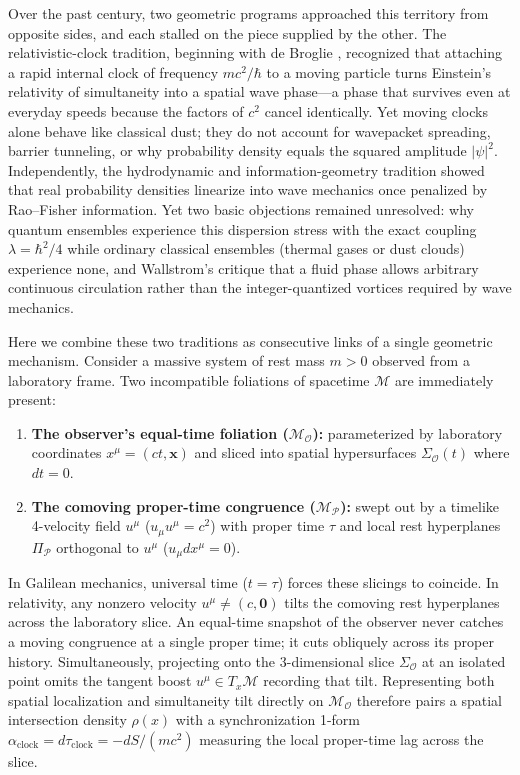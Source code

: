 \documentclass[11pt, a4paper]{article}
\theoremstyle{definition}
\begin{document}
Over the past century, two geometric programs approached this territory from opposite sides, and each stalled on the piece supplied by the other. The relativistic-clock tradition, beginning with de Broglie \cite{deBroglie1924}, recognized that attaching a rapid internal clock of frequency $mc^2/\hbar$ to a moving particle turns Einstein's relativity of simultaneity into a spatial wave phase---a phase that survives even at everyday speeds because the factors of $c^2$ cancel identically. Yet moving clocks alone behave like classical dust; they do not account for wavepacket spreading, barrier tunneling, or why probability density equals the squared amplitude $|\psi|^2$. Independently, the hydrodynamic and information-geometry tradition \cite{Madelung1927, Bohm1952, Reginatto1998, HallReginatto2002} showed that real probability densities linearize into wave mechanics once penalized by Rao--Fisher information. Yet two basic objections remained unresolved: why quantum ensembles experience this dispersion stress with the exact coupling $\lambda = \hbar^2/4$ while ordinary classical ensembles (thermal gases or dust clouds) experience none, and Wallstrom's critique \cite{Wallstrom1994} that a fluid phase allows arbitrary continuous circulation rather than the integer-quantized vortices required by wave mechanics.

Here we combine these two traditions as consecutive links of a single geometric mechanism. Consider a massive system of rest mass $m > 0$ observed from a laboratory frame. Two incompatible foliations of spacetime $\mathcal{M}$ are immediately present:
\begin{enumerate}[label=(\arabic*)]
    \item \textbf{The observer's equal-time foliation ($\mathcal{M}_{\mathcal{O}}$):} parameterized by laboratory coordinates $x^\mu = (ct, \mathbf{x})$ and sliced into spatial hypersurfaces $\Sigma_{\mathcal{O}}(t)$ where $dt = 0$.
    \item \textbf{The comoving proper-time congruence ($\mathcal{M}_{\mathcal{P}}$):} swept out by a timelike 4-velocity field $u^\mu$ ($u_\mu u^\mu = c^2$) with proper time $\tau$ and local rest hyperplanes $\Pi_{\mathcal{P}}$ orthogonal to $u^\mu$ ($u_\mu dx^\mu = 0$).
\end{enumerate}
In Galilean mechanics, universal time ($t = \tau$) forces these slicings to coincide. In relativity, any nonzero velocity $u^\mu \neq (c, \mathbf{0})$ tilts the comoving rest hyperplanes across the laboratory slice. An equal-time snapshot of the observer never catches a moving congruence at a single proper time; it cuts obliquely across its proper history. Simultaneously, projecting onto the 3-dimensional slice $\Sigma_{\mathcal{O}}$ at an isolated point omits the tangent boost $u^\mu \in T_x\mathcal{M}$ recording that tilt. Representing both spatial localization and simultaneity tilt directly on $\mathcal{M}_{\mathcal{O}}$ therefore pairs a spatial intersection density $\rho(x)$ with a synchronization 1-form $\alpha_{\text{clock}} = d\tau_{\text{clock}} = -dS/(mc^2)$ measuring the local proper-time lag across the slice.
\end{document}

